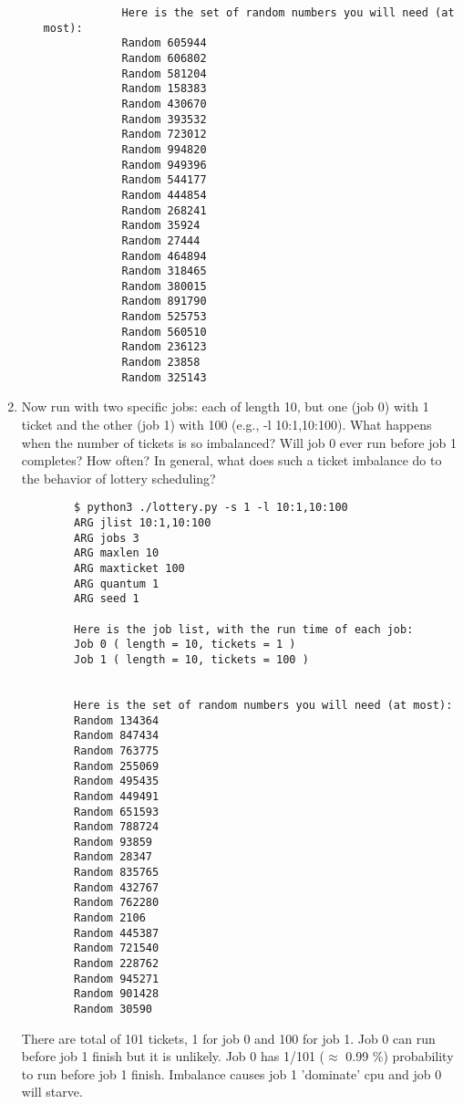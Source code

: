 \documentclass{article}
\begin{document}
\begin{enumerate}[label=\textbf{\arabic*}), start=1]
\begin{enumerate}[label=\textbf{\arabic*}), start=1]
{\begin{verbatim}
            Here is the set of random numbers you will need (at most):
            Random 605944
            Random 606802
            Random 581204
            Random 158383
            Random 430670
            Random 393532
            Random 723012
            Random 994820
            Random 949396
            Random 544177
            Random 444854
            Random 268241
            Random 35924
            Random 27444
            Random 464894
            Random 318465
            Random 380015
            Random 891790
            Random 525753
            Random 560510
            Random 236123
            Random 23858
            Random 325143
    \end{verbatim}
    }

    \end{enumerate}
    \newpage

    \item Now run with two specific jobs: each of length 10,
    but one (job 0) with 1 ticket and the other (job 1) with
    100 (e.g., -l 10:1,10:100). What happens when the number
    of tickets is so imbalanced? Will job 0 ever run before
    job 1 completes? How often? In general, what does such 
    a ticket imbalance do to the behavior of lottery scheduling?

    {\scriptsize

    \begin{verbatim}
        $ python3 ./lottery.py -s 1 -l 10:1,10:100
        ARG jlist 10:1,10:100
        ARG jobs 3
        ARG maxlen 10
        ARG maxticket 100
        ARG quantum 1
        ARG seed 1

        Here is the job list, with the run time of each job: 
        Job 0 ( length = 10, tickets = 1 )
        Job 1 ( length = 10, tickets = 100 )


        Here is the set of random numbers you will need (at most):
        Random 134364
        Random 847434
        Random 763775
        Random 255069
        Random 495435
        Random 449491
        Random 651593
        Random 788724
        Random 93859
        Random 28347
        Random 835765
        Random 432767
        Random 762280
        Random 2106
        Random 445387
        Random 721540
        Random 228762
        Random 945271
        Random 901428
        Random 30590
    \end{verbatim}
    }
    There are total of 101 tickets, 1 for job 0 and 100 for job 1. Job 0
    can run before job 1 finish but it is unlikely. Job 0 has 1/101
    (\(\approx\) 0.99 \%) probability to run before job 1 finish.
    Imbalance causes job 1 'dominate' cpu and job 0 will starve.
\end{enumerate}



\newpage


\end{document}
